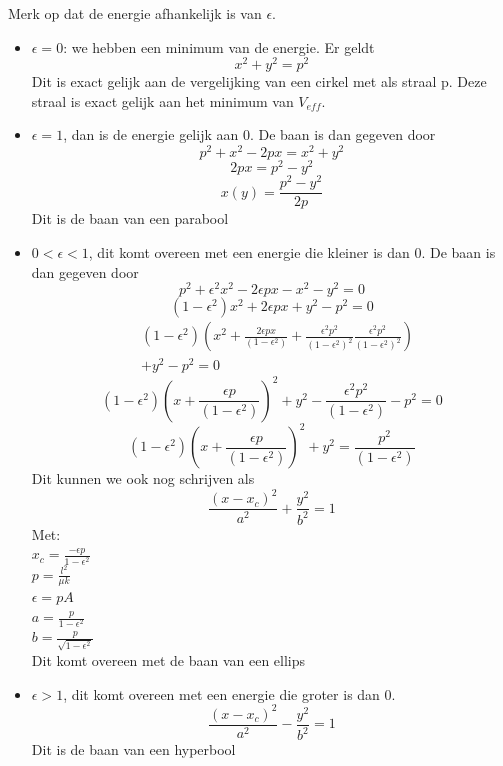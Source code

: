 Merk op dat de energie afhankelijk is van $\epsilon$. 
\begin{itemize}
\item  $\epsilon=0$: we hebben een minimum van de energie. Er geldt
$$x^{2}+y^{2}=p^{2}$$
Dit is exact gelijk aan de vergelijking van een cirkel met als straal p. Deze straal is exact gelijk aan het minimum van $V_{eff}$. 
\item $\epsilon=1$, dan is de energie gelijk aan 0. De baan is dan gegeven door
$$p^{2}+x^{2}-2px=x^{2}+y^{2}$$
$$2px=p^{2}-y^{2}$$
$$x(y)=\frac{p^{2}-y^{2}}{2p}$$
Dit is de baan van een parabool
\item $0<\epsilon<1$, dit komt overeen met een energie die kleiner is dan 0. De baan is dan gegeven door
$$p^{2}+\epsilon^{2}x^{2}-2\epsilon px-x^{2}-y^{2}=0$$
$$\left(1-\epsilon^{2}\right)x^{2}+2\epsilon px+y^{2}-p^{2}=0$$
\begin{align}
    &\left(1-\epsilon^{2}\right)\left(x^{2}+\frac{2\epsilon px}{(1-\epsilon^{2})}+\frac{\epsilon^{2}p^{2}}{(1-\epsilon^{2})^{2}} \frac{\epsilon^{2}p^{2}}{(1-\epsilon^{2})^{2}}\right)\nonumber \\
    &+y^{2}-p^{2}=0    \nonumber
\end{align}
$$\left(1-\epsilon^{2}\right)\left(x+\frac{\epsilon p}{(1-\epsilon^{2})}\right)^{2}+y^{2}-\frac{\epsilon^{2}p^{2}}{(1-\epsilon^{2})}-p^{2}=0$$
$$\left(1-\epsilon^{2}\right)\left(x+\frac{\epsilon p}{(1-\epsilon^{2})}\right)^{2}+y^{2}=\frac{p^{2}}{(1-\epsilon^{2})}$$
Dit kunnen we ook nog schrijven als
$$\frac{(x-x_{c})^{2}}{a^{2}}+\frac{y^{2}}{b^{2}}=1$$
Met: \\
$x_{c}=\frac{-\epsilon p}{1-\epsilon^{2}}$ \\
$p=\frac{l^{2}}{\mu k}$\\
$\epsilon = pA$\\
$a=\frac{p}{1-\epsilon^{2}}$\\
$b=\frac{p}{\sqrt{1-\epsilon^{2}}}$\\
Dit komt overeen met de baan van een ellips
\item $\epsilon > 1$, dit komt overeen met een energie die groter is dan 0. 
$$\frac{(x-x_{c})^{2}}{a^{2}}-\frac{y^{2}}{b^{2}}=1$$
Dit is de baan van een hyperbool
\end{itemize}
